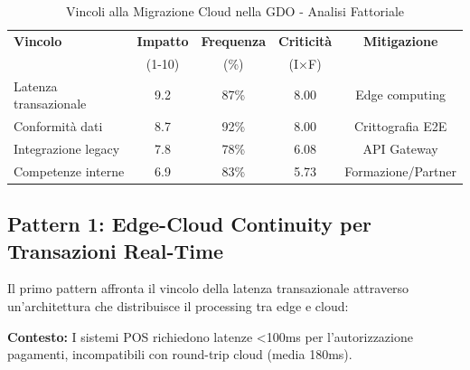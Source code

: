 \begin{table}[htbp]
\centering
\caption{Vincoli alla Migrazione Cloud nella GDO - Analisi Fattoriale}
\label{tab:migration_constraints}
\begin{tabular}{lcccc}
\toprule
\textbf{Vincolo} & \textbf{Impatto} & \textbf{Frequenza} & \textbf{Criticità} & \textbf{Mitigazione} \\
& (1-10) & (\%) & (I×F) & \\
\midrule
Latenza transazionale & 9.2 & 87\% & 8.00 & Edge computing \\
Conformità dati & 8.7 & 92\% & 8.00 & Crittografia E2E \\
Integrazione legacy & 7.8 & 78\% & 6.08 & API Gateway \\
Competenze interne & 6.9 & 83\% & 5.73 & Formazione/Partner \\
\bottomrule
\end{tabular}
\end{table}



\subsection{\texorpdfstring{Pattern 1: Edge-Cloud Continuity per Transazioni Real-Time}{3.3.1 - Pattern 1: Edge-Cloud Continuity per Transazioni Real-Time}}

Il primo pattern affronta il vincolo della latenza transazionale attraverso un'architettura che distribuisce il processing tra edge e cloud:

\textbf{Contesto:}
I sistemi POS richiedono latenze <100ms per l'autorizzazione pagamenti, incompatibili con round-trip cloud (media 180ms).

